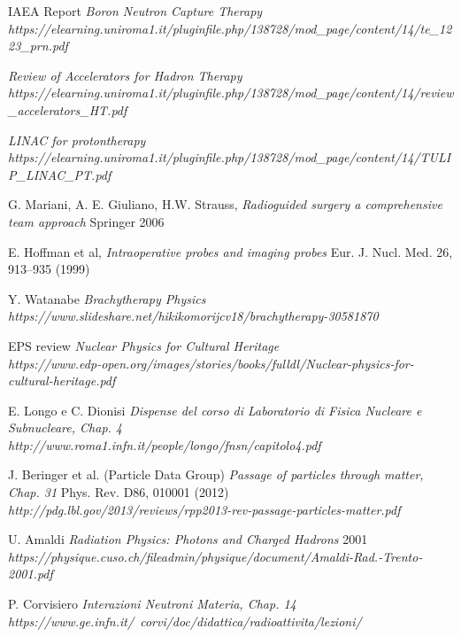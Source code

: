 \documentclass [a4paper, twoside] {book}
\begin{document}
\begin{thebibliography}{35}
IAEA Report
\textit{Boron Neutron Capture Therapy}
\\ \textit{https://elearning.uniroma1.it/pluginfile.php/138728/mod\_page/content/14/te\_1223\_prn.pdf}

\textit{Review of Accelerators for Hadron Therapy}
\\ \textit{https://elearning.uniroma1.it/pluginfile.php/138728/mod\_page/content/14/review\_accelerators\_HT.pdf}

\textit{LINAC for protontherapy}
\\ \textit{https://elearning.uniroma1.it/pluginfile.php/138728/mod\_page/content/14/TULIP\_LINAC\_PT.pdf}

G. Mariani, A. E. Giuliano, H.W. Strauss,
\textit{Radioguided surgery a comprehensive team approach}
Springer 2006

E. Hoffman et al,
\textit{Intraoperative probes and imaging probes}
Eur. J. Nucl. Med. 26, 913–935 (1999)

Y. Watanabe
\textit{Brachytherapy Physics}
\\ \textit{https://www.slideshare.net/hikikomorijcv18/brachytherapy-30581870}

EPS review
\textit{Nuclear Physics for Cultural Heritage}
\\ \textit{https://www.edp-open.org/images/stories/books/fulldl/Nuclear-physics-for-cultural-heritage.pdf}

E. Longo e C. Dionisi
\textit{Dispense del corso di Laboratorio di Fisica Nucleare e Subnucleare, Chap. 4}
\\ \textit{http://www.roma1.infn.it/people/longo/fnsn/capitolo4.pdf}

J. Beringer et al. (Particle Data Group)
\textit{Passage of particles through matter, Chap. 31}
Phys. Rev. D86, 010001 (2012)
\\ \textit{http://pdg.lbl.gov/2013/reviews/rpp2013-rev-passage-particles-matter.pdf}

U. Amaldi
\textit{Radiation Physics: Photons and Charged Hadrons}
2001 \\ \textit{https://physique.cuso.ch/fileadmin/physique/document/Amaldi-Rad.-Trento-2001.pdf}

P. Corvisiero
\textit{Interazioni Neutroni Materia, Chap. 14}
\\ \textit{https://www.ge.infn.it/~corvi/doc/didattica/radioattivita/lezioni/}


\end{thebibliography}
\end{document}
